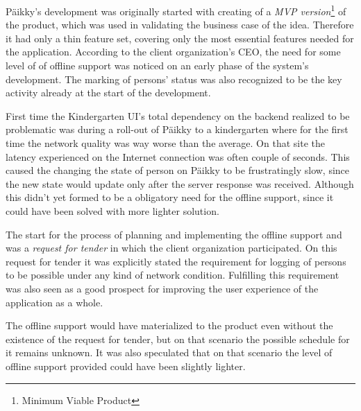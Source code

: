 Päikky's development was originally started with creating of a \textit{MVP version}\footnote{Minimum Viable Product} of the product, which was used in validating the business case of the idea. Therefore it had only a thin feature set, covering only the most essential features needed for the application. According to the client organization's CEO, the need for some level of of offline support was noticed on an early phase of the system's development. The marking of persons' status was also recognized to be the key activity already at the start of the development.

First time the Kindergarten UI's total dependency on the backend realized to be problematic was during a roll-out of Päikky to a kindergarten where for the first time the network quality was way worse than the average. On that site the latency experienced on the Internet connection was often couple of seconds. This caused the changing the state of person on Päikky to be frustratingly slow, since the new state would update only after the server response was received. Although this didn't yet formed to be a obligatory need for the offline support, since it could have been solved with more lighter solution.

The start for the process of planning and implementing the offline support and was a \textit{request for tender} in which the client organization participated. On this request for tender it was explicitly stated the requirement for logging of persons to be possible under any kind of network condition. Fulfilling this requirement was also seen as a good prospect for improving the user experience of the application as a whole.

The offline support would have materialized to the product even without the existence of the request for tender, but on that scenario the possible schedule for it remains unknown. It was also speculated that on that scenario the level of offline support provided could have been slightly lighter.

















